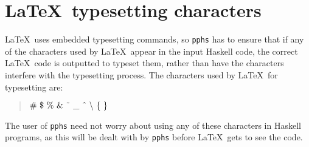 \section{\LaTeX\ typesetting characters}

\LaTeX\ uses embedded typesetting commands, so {\tt pphs} has to ensure that if
any of the characters used by \LaTeX\ appear in the input Haskell code, the correct
\LaTeX\ code is outputted to typeset them, rather than have the characters interfere
with the typesetting process.  The characters used by \LaTeX\ for typesetting are:
\begin{quote}
\(\#\ \$\ \%\ \&\ \char'176\ \_\ \char'136\ \hbox{$\setminus$}\ \hbox{$\cal \char'146\ \char'147$}\)
\end{quote}
The user of {\tt pphs} need not worry about using any of these characters in Haskell
programs, as this will be dealt with by {\tt pphs} before \LaTeX\ gets to see the code.